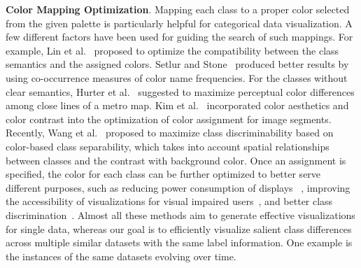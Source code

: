 \vspace{1.5mm}
\noindent\textbf{Color Mapping Optimization}. Mapping each class to a proper color selected from the given palette is particularly helpful for categorical data visualization. %
A few different factors have been used for guiding the search of such mappings.
For example, Lin et al.~\cite{lin2013selecting} proposed to optimize the compatibility between the class semantics and the assigned colors. Setlur and Stone~\cite{setlur2016linguistic} produced better results by using co-occurrence measures of color name frequencies.
For the classes without clear semantics,  Hurter et al.~\cite{Hurter10} suggested to maximize perceptual color differences among close lines of a metro map.
Kim et al.~\cite{Kim14} incorporated color aesthetics and color contrast into the optimization of color assignment for image segments.
Recently, Wang et al.~\cite{Wang2018} proposed to maximize class discriminability based on color-based class separability, which takes into account spatial relationships between classes and the contrast with background color.
Once an assignment is specified, the color for each class can be further optimized to better serve different purposes, such as reducing power consumption of displays~\cite{chuang2009energy} ,
improving the accessibility of visualizations for visual impaired users~\cite{machado2009physiologically}, and better class discrimination~\cite{lee2013perceptually}.
Almost all these methods aim to generate effective visualizations for single data, whereas our goal is to efficiently visualize salient class differences across multiple similar datasets with the same label information. One example is the instances of the same datasets evolving over time.

